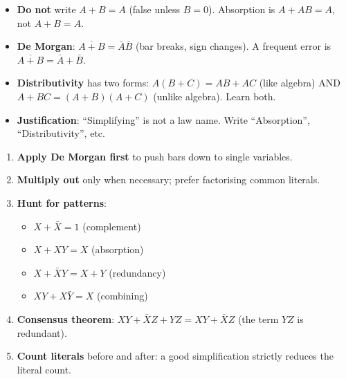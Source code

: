 \documentclass[11pt]{article}
\begin{document}
\begin{attention}
\begin{itemize}
\item \textbf{Do not} write $A+B=A$ (false unless $B=0$). Absorption is $A+AB=A$, not $A+B=A$.
\item \textbf{De Morgan}: $\overline{A+B}=\bar{A}\bar{B}$ (bar breaks, sign changes). A frequent error is $\overline{A+B}=\bar{A}+\bar{B}$.
\item \textbf{Distributivity} has two forms: $A(B+C)=AB+AC$ (like algebra) AND $A+BC=(A+B)(A+C)$ (unlike algebra). Learn both.
\item \textbf{Justification}: ``Simplifying'' is not a law name. Write ``Absorption'', ``Distributivity'', etc.
\end{itemize}
\end{attention}

\begin{methode}
\begin{enumerate}
\item \textbf{Apply De Morgan first} to push bars down to single variables.
\item \textbf{Multiply out} only when necessary; prefer factorising common literals.
\item \textbf{Hunt for patterns}:
      \begin{itemize}
      \item $X+\bar{X}=1$ (complement)
      \item $X+XY=X$ (absorption)
      \item $X+\bar{X}Y=X+Y$ (redundancy)
      \item $XY+X\bar{Y}=X$ (combining)
      \end{itemize}
\item \textbf{Consensus theorem}: $XY+\bar{X}Z+YZ=XY+\bar{X}Z$ (the term $YZ$ is redundant).
\item \textbf{Count literals} before and after: a good simplification strictly reduces the literal count.
\end{enumerate}
\end{methode}
\end{document}
